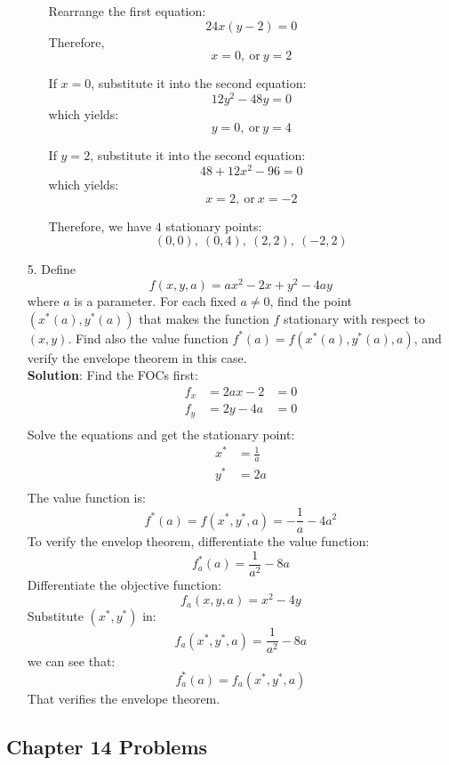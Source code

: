\documentclass{article}
\begin{document}
\begin{enumerate}
\begin{enumerate}
            Rearrange the first equation:
            $$  24x(y-2) = 0 $$
            Therefore,
            $$ x = 0,\ \textrm{or}\ y = 2 $$
            
            If $x = 0$, substitute it into the second equation:
            $$ 12y^2 - 48y = 0 $$
            which yields:
            $$ y=0,\ \textrm{or}\ y=4 $$
            
            If $y=2$, substitute it into the second equation:
            $$ 48 + 12x^2 - 96 = 0 $$
            which yields:
            $$ x=2,\ \textrm{or}\ x=-2 $$
            
            Therefore, we have $4$ stationary points:
            $$(0,0),\ (0,4),\ (2,2),\ (-2,2)$$
        \end{enumerate}
        
    \item[5. ] Define $$ f(x,y,a) = ax^2 -2x + y^2 - 4ay $$ where $a$ is a parameter. For each fixed $a \neq 0$, find the point $(x^*(a), y^*(a))$ that makes the function $f$ stationary with respect to $(x,y)$. Find also the value function $f^*(a)=f(x^*(a), y^*(a), a)$, and verify the envelope theorem in this case. \\
    
    \textbf{Solution}: Find the FOCs first:
    \begin{align*}
        f_x &= 2ax -2  &= 0 \\
        f_y &= 2y - 4a &= 0 \\
    \end{align*}
    Solve the equations and get the stationary point:
    \begin{align*}
        x^* &= \frac{1}{a} \\
        y^* &= 2a \\
    \end{align*}
    The value function is:
    $$ f^*(a) = f(x^*, y^*, a) = -\frac{1}{a}-4a^2 $$
    To verify the envelop theorem, differentiate the value function:
    $$ f^*_a(a) = \frac{1}{a^2} - 8a $$
    Differentiate the objective function:
    $$ f_a(x,y,a) = x^2 - 4y $$
    Substitute $(x^*, y^*)$ in:
    $$ f_a(x^*, y^*,a) = \frac{1}{a^2} - 8a $$
    we can see that:
    $$ f^*_a(a) = f_a(x^*, y^*, a)$$
    That verifies the envelope theorem.
      
\end{enumerate}


\subsection*{Chapter 14 Problems}
\vspace{0.1in}
\end{document}
